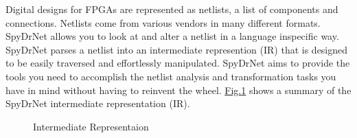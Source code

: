 \documentclass[letterpaper,10pt,english,openany,oneside]{sphinxmanual}
\begin{document}

Digital designs for FPGAs are represented as netlists, a list of components and connections. Netlists come from various vendors in many different formats. SpyDrNet allows you to look at and alter a netlist in a language inspecific way. SpyDrNet parses a netlist into an intermediate represention (IR) that is designed to be easily traversed and effortlessly manipulated. SpyDrNet aims to provide the tools you need to accomplish the netlist analysis and transformation tasks you have in mind without having to reinvent the wheel. \hyperref[\detokenize{reference/introduction:fig-ir}]{Fig.\@ \ref{\detokenize{reference/introduction:fig-ir}}} shows a summary of the SpyDrNet intermediate representation (IR).

\begin{figure}[H]
\centering
\capstart

\noindent{}
\caption{Intermediate Representaion}\label{\detokenize{reference/introduction:id4}}\label{\detokenize{reference/introduction:fig-ir}}\end{figure}
\end{document}
